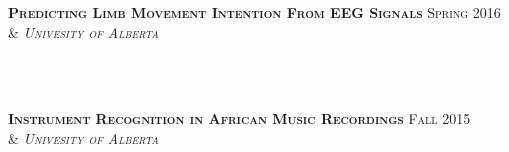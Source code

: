 \documentclass[10pt]{article} %
\begin{document}
\begin{minipage}[t]{0.43\textwidth}

{\raggedright\textsc{\textbf{Predicting Limb Movement Intention From EEG Signals} \hfill Spring 2016\\
& \textit{Univesity of Alberta}}} \\ \\
\vspace{4mm} 


{\raggedright\textsc{\textbf{Instrument Recognition in African Music Recordings} \hfill Fall 2015\\
& \textit{Univesity of Alberta}}} \\
\vspace{4mm} 



%
%
%
%
%



\end{minipage}
\end{document}
